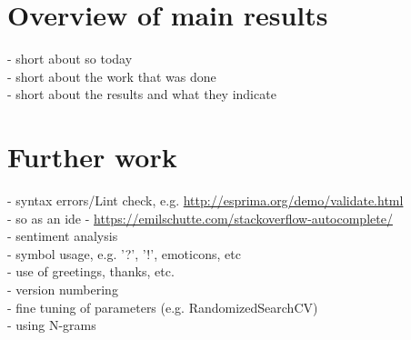 \label{chap:chapter6}

\section{Overview of main results}
\label{sec:main_results}
- short about \gls{so} today \\
- short about the work that was done \\
- short about the results and what they indicate  \\


\section{Further work}
\label{sec:further_work}
- syntax errors/Lint check, e.g. \url{http://esprima.org/demo/validate.html} \\
- \gls{so} as an \gls{ide} - \url{https://emilschutte.com/stackoverflow-autocomplete/} \\
- sentiment analysis \\
- symbol usage, e.g. '?', '!', emoticons, etc \\
- use of greetings, thanks, etc. \\
- version numbering \\
- fine tuning of parameters (e.g. RandomizedSearchCV) \\
- using N-grams
